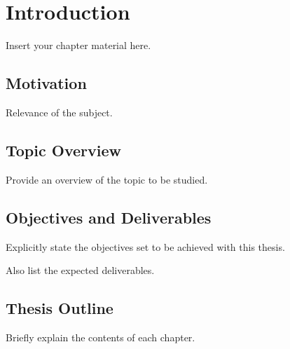 
\chapter{Introduction}
\label{chapter:introduction}

Insert your chapter material here.

\section{Motivation}
\label{section:motivation}

Relevance of the subject.


\section{Topic Overview}
\label{section:overview}

Provide an overview of the topic to be studied.


\section{Objectives and Deliverables}
\label{section:objectives}

Explicitly state the objectives set to be achieved with this thesis.

Also list the expected deliverables.


\section{Thesis Outline}
\label{section:outline}

Briefly explain the contents of each chapter.

